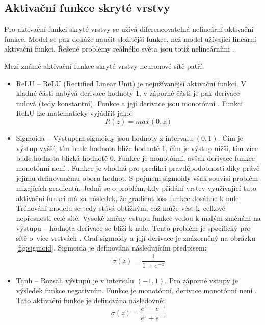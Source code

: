 \subsection{Aktivační funkce skryté vrstvy}
Pro aktivační funkci skryté vrstvy se užívá diferencovatelná nelineární aktivační funkce. Model se pak dokáže naučit složitější funkce, než model užívající lineární aktivační funkci. Řešené problémy reálného světa jsou totiž nelineárními \cite{HowToChooseActivationFunction}. 

Mezi známé aktivační funkce skryté vrstvy neuronové sítě patří:
\begin{itemize}
    \item ReLU -- ReLU (Rectified Linear Unit) je nejužívanější aktivační funkcí. V kladné části nabývá derivace hodnoty 1, v záporné části je pak derivace nulová (tedy konstantní). Funkce a její derivace jsou monotónní \cite{ActivationFunctionsInNeuralNetworks}. Funkci ReLU lze matematicky vyjádřit jako:
    \begin{equation} 
    R(z) = max(0, z)
    \end{equation} 
    \item Sigmoida -- Výstupem sigmoidy jsou hodnoty z intervalu $(0, 1)$. Čím je výstup vyšší, tím bude hodnota blíže hodnotě 1, čím je výstup nižší, tím více bude hodnota blízká hodnotě 0. Funkce je monotónní, avšak derivace funkce monotónní není \cite{ActivationFunctionsInNeuralNetworks}. Funkce je vhodná pro predikci pravděpodobnosti díky právě jejímu definovanému oboru hodnot. S pojmem sigmoidy však souvisí problém mizejících gradientů. Jedná se o problém, kdy přidání vrstev využívající tuto aktivační funkci má za následek, že gradient loss funkce dosáhne k nule. Trénování modelu se tedy stává obtížným, což může vést k~celkové nepřesnosti celé sítě. Vysoké změny vstupu funkce vedou k malým změnám na výstupu -- hodnota derivace se blíží k nule. Tento problém je specifický pro sítě o~více vrstvách \cite{VanishingGradientProblem}. Graf sigmoidy a její derivace je znázorněný na obrázku \ref{fig:sigmoid}. Sigmoida je definována následujícím předpisem:
     \begin{equation} 
    \sigma(z) = \frac{1}{1+e^{-z}}
    \end{equation} 
    \item Tanh -- Rozsah výstupů je v intervalu $(-1, 1)$. Pro záporné vstupy je výsledek funkce negativním. Funkce je monotónní, derivace monotónní není \cite{ActivationFunctionsInNeuralNetworks}. Tato aktivační funkce je definována následovně:
       \begin{equation} 
    \sigma(z) = \frac{e^{z}-e^{-z}}{e^{z}+e^{-z}}
    \end{equation} 
\end{itemize}


